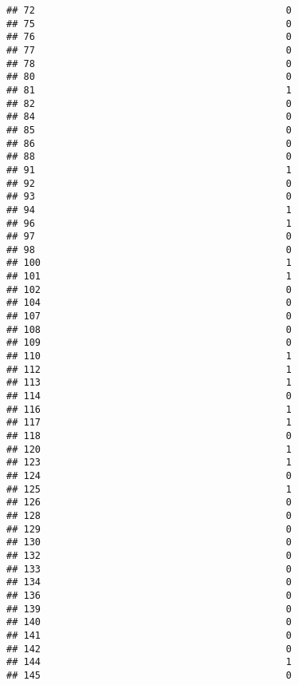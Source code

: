 \documentclass[
]{article}
\begin{document}
\begin{verbatim}
## 72                                            0
## 75                                            0
## 76                                            0
## 77                                            0
## 78                                            0
## 80                                            0
## 81                                            1
## 82                                            0
## 84                                            0
## 85                                            0
## 86                                            0
## 88                                            0
## 91                                            1
## 92                                            0
## 93                                            0
## 94                                            1
## 96                                            1
## 97                                            0
## 98                                            0
## 100                                           1
## 101                                           1
## 102                                           0
## 104                                           0
## 107                                           0
## 108                                           0
## 109                                           0
## 110                                           1
## 112                                           1
## 113                                           1
## 114                                           0
## 116                                           1
## 117                                           1
## 118                                           0
## 120                                           1
## 123                                           1
## 124                                           0
## 125                                           1
## 126                                           0
## 128                                           0
## 129                                           0
## 130                                           0
## 132                                           0
## 133                                           0
## 134                                           0
## 136                                           0
## 139                                           0
## 140                                           0
## 141                                           0
## 142                                           0
## 144                                           1
## 145                                           0

\end{verbatim}
\end{document}
